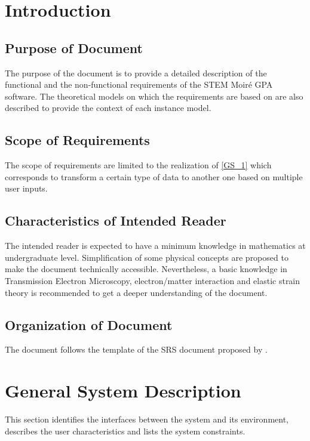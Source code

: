 \documentclass[12pt]{article}
\newcommand{\progname}{STEM Moir{\'e} GPA}
\begin{document}
\newpage
{}

\section{Introduction}

\subsection{Purpose of Document}

The purpose of the document is to provide a detailed description of the functional and the non-functional requirements of the \progname{} software.  The theoretical models on which the requirements are based on are also described to provide the context of each instance model.

\subsection{Scope of Requirements} 

The scope of requirements are limited to the realization of \cref{GS_1} which corresponds to transform a certain type of data to another one based on multiple user inputs.

\subsection{Characteristics of Intended Reader} 

The intended reader is expected to have a minimum knowledge in mathematics at undergraduate level. Simplification of some physical concepts are proposed to make the document technically accessible. Nevertheless, a basic knowledge in Transmission Electron Microscopy, electron/matter interaction and elastic strain theory is recommended to get a deeper understanding of the document. 

\subsection{Organization of Document}

The document follows the template of the SRS document proposed by \cite{SmithAndLai2005, SmithEtAl2007}. 

\section{General System Description}

This section identifies the interfaces between the system and its environment,
describes the user characteristics and lists the system constraints.
\end{document}
